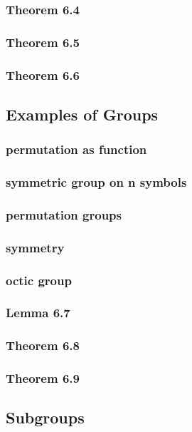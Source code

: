 \documentclass[a4paper]{article}
\begin{document}
\subsubsection*{Theorem 6.4}
\subsubsection*{Theorem 6.5}
\subsubsection*{Theorem 6.6}

\newpage
\subsection{Examples of Groups}   %
\subsubsection*{permutation as function}
\subsubsection*{symmetric group on n symbols}
\subsubsection*{permutation groups}
\subsubsection*{symmetry}
\subsubsection*{octic group}
\subsubsection*{Lemma 6.7}
\subsubsection*{Theorem 6.8}
\subsubsection*{Theorem 6.9}

\newpage
\subsection{Subgroups}   %
\end{document}
